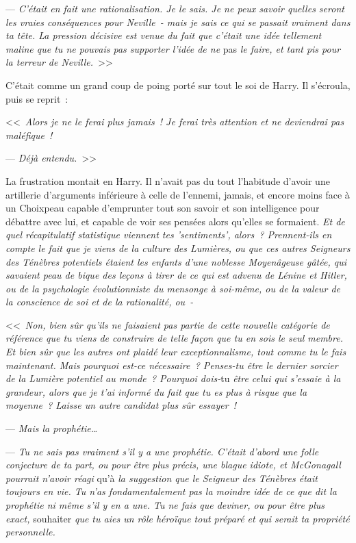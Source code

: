 --- \emph{C'était en fait une rationalisation. Je le sais. Je ne peux savoir quelles seront les vraies conséquences pour Neville~- mais je sais ce qui se passait vraiment dans ta tête. La pression décisive est venue du fait que c'était une idée tellement maline que tu ne pouvais pas supporter l'idée de ne} pas \emph{le faire, et tant pis pour la terreur de Neville.}~>>

C'était comme un grand coup de poing porté sur tout le soi de Harry. Il s'écroula, puis se reprit~:

<<~\emph{Alors je ne le ferai plus jamais~! Je ferai très attention et ne deviendrai pas maléfique~!}

--- \emph{Déjà entendu.}~>>

La frustration montait en Harry. Il n'avait pas du tout l'habitude d'avoir une artillerie d'arguments inférieure à celle de l'ennemi, jamais, et encore moins face à un Choixpeau capable d'emprunter tout son savoir et son intelligence pour débattre avec lui, et capable de voir ses pensées alors qu'elles se formaient. \emph{Et de quel récapitulatif statistique viennent tes 'sentiments', alors~? Prennent-ils en compte le fait que je viens de la culture des Lumières, ou que ces autres Seigneurs des Ténèbres potentiels étaient les enfants d'une noblesse Moyenâgeuse gâtée, qui savaient peau de bique des leçons à tirer de ce qui est advenu de Lénine et Hitler, ou de la psychologie évolutionniste du mensonge à soi-même, ou de la valeur de la conscience de soi et de la rationalité, ou~-}

<<~\emph{Non, bien sûr qu'ils ne faisaient pas partie de cette nouvelle catégorie de référence que tu viens de construire de telle façon que tu en sois le seul membre. Et bien sûr que les autres ont plaidé leur exceptionnalisme, tout comme tu le fais maintenant. Mais pourquoi est-ce nécessaire~? Penses-tu être le dernier sorcier de la Lumière potentiel au monde~? Pourquoi dois-}tu \emph{être celui qui s'essaie à la grandeur, alors que je t'ai informé du fait que tu es plus à risque que la moyenne~? Laisse un autre candidat plus sûr essayer~!}

--- \emph{Mais la prophétie…}

--- \emph{Tu ne sais pas vraiment s'il y a une prophétie. C'était d'abord une folle conjecture de ta part, ou pour être plus précis, une blague idiote, et McGonagall pourrait n'avoir réagi} qu'à \emph{la suggestion que le Seigneur des Ténèbres était toujours en vie. Tu n'as fondamentalement pas la moindre idée de ce que dit la prophétie ni même s'il y en a une. Tu ne fais que deviner, ou pour être plus exact,} souhaiter \emph{que tu aies un rôle héroïque tout préparé et qui serait ta propriété personnelle.}

